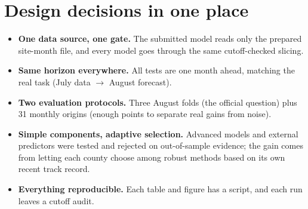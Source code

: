 \documentclass[11pt,letterpaper]{article}
\begin{document}
\section{Design decisions in one place}
\begin{itemize}
  \item \textbf{One data source, one gate.} The submitted model reads only the prepared site-month file,
        and every model goes through the same cutoff-checked slicing.
  \item \textbf{Same horizon everywhere.} All tests are one month ahead, matching the real task (July data
        $\rightarrow$ August forecast).
  \item \textbf{Two evaluation protocols.} Three August folds (the official question) plus 31 monthly
        origins (enough points to separate real gains from noise).
  \item \textbf{Simple components, adaptive selection.} Advanced models and external predictors were tested
        and rejected on out-of-sample evidence; the gain comes from letting each county choose among
        robust methods based on its own recent track record.
  \item \textbf{Everything reproducible.} Each table and figure has a script, and each run leaves a cutoff audit.
\end{itemize}
\end{document}
